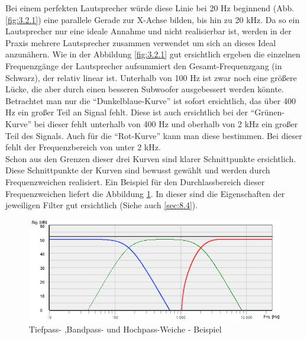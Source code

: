 Bei einem perfekten Lautsprecher würde diese Linie bei 20 Hz beginnend (Abb. \ref{fig:3.2.1}) eine parallele Gerade zur X-Achse bilden, bis hin zu 20 kHz.
Da so ein Lautsprecher nur eine ideale Annahme und nicht realisierbar ist, werden in der Praxis mehrere Lautsprecher zusammen verwendet um sich an dieses Ideal anzunähern.
Wie in der Abbildung \ref{fig:3.2.1} gut ersichtlich ergeben die einzelnen Frequenzgänge der Lautsprecher aufsummiert den Gesamt-Frequenzgang (in Schwarz), der relativ linear ist.
Unterhalb von 100 Hz ist zwar noch eine größere Lücke, die aber durch einen besseren Subwoofer ausgebessert werden könnte.\\
Betrachtet man nur die \enquote{Dunkelblaue-Kurve} ist sofort ersichtlich, das über 400 Hz ein großer Teil an Signal fehlt.
Diese ist auch ersichtlich bei der \enquote{Grünen-Kurve} bei dieser fehlt unterhalb von 400 Hz und oberhalb von 2 kHz ein großer Teil des Signals.
Auch für die \enquote{Rot-Kurve} kann man diese bestimmen.
Bei dieser fehlt der Frequenzbereich von unter 2 kHz.\\
Schon aus den Grenzen dieser drei Kurven sind klarer Schnittpunkte ersichtlich.
Diese Schnittpunkte der Kurven sind bewusst gewählt und werden durch Frequenzweichen realisiert.
Ein Beispiel für den Durchlassbereich dieser Frequenzweichen liefert die Abbildung \ref{fig:3.2.2}.
In dieser sind die Eigenschaften der jeweiligen Filter gut ersichtlich (Siehe auch \ref{sec:8.4}).
\begin{figure} [H]
	\centering
	\includegraphics[width=1\textwidth]{img/Grundlagen/Mehrweg-Lautsprechersysteme/Frequenzbereiche-Audio-Weiche-cut.jpg}
	\caption{Tiefpass- ,Bandpass- und Hochpass-Weiche - Beispiel}
	\label{fig:3.2.2}
\end{figure}

